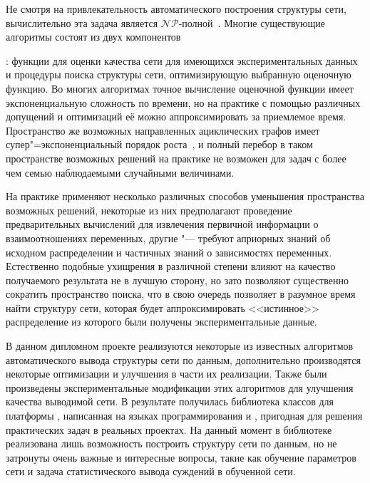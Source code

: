 Не смотря на привлекательность автоматического построения структуры сети, вычислительно эта задача является $\mathcal{NP}$-полной~\cite{Chickering96learningbayesian}.
Многие существующие алгоритмы состоят из двух компонентов: функции для оценки качества сети для имеющихся экспериментальных данных и процедуры поиска структуры сети, оптимизирующую выбранную оценочную функцию.
Во многих алгоритмах точное вычисление оценочной функции имеет экспоненциальную сложность по времени, но на практике с помощью различных допущений и оптимизаций её можно аппроксимировать за приемлемое время.
Пространство же возможных направленных ациклических графов имеет супер"=экспоненциальный порядок роста~\cite{robinson_1977}, и полный перебор в таком пространстве возможных решений на практике не возможен для задач с более чем семью наблюдаемыми случайными величинами.

На практике применяют несколько различных способов уменьшения пространства возможных решений, некоторые из них предполагают проведение предварительных вычислений для извлечения первичной информации о взаимоотношениях переменных, другие "--- требуют априорных знаний об исходном распределении и частичных знаний о зависимостях переменных.
Естественно подобные ухищрения в различной степени влияют на качество получаемого результата не в лучшую сторону, но зато позволяют существенно сократить пространство поиска, что в свою очередь позволяет в разумное время найти структуру сети, которая будет аппроксимировать <<истинное>> распределение из которого были получены экспериментальные данные.

В данном дипломном проекте реализуются некоторые из известных алгоритмов автоматического вывода структуры сети по данным, дополнительно производятся некоторые оптимизации и улучшения в части их реализации. 
Также были произведены экспериментальные модификации этих алгоритмов для улучшения качества выводимой сети. 
В результате получилась библиотека классов для платформы \dotnet{}, написанная на языках программирования \csharp{} и \fsharp{}, пригодная для решения практических задач в реальных проектах.
На данный момент в библиотеке реализована лишь возможность построить структуру сети по данным, но не затронуты очень важные и интересные вопросы, такие как обучение параметров сети и задача статистического вывода суждений в обученной сети.
